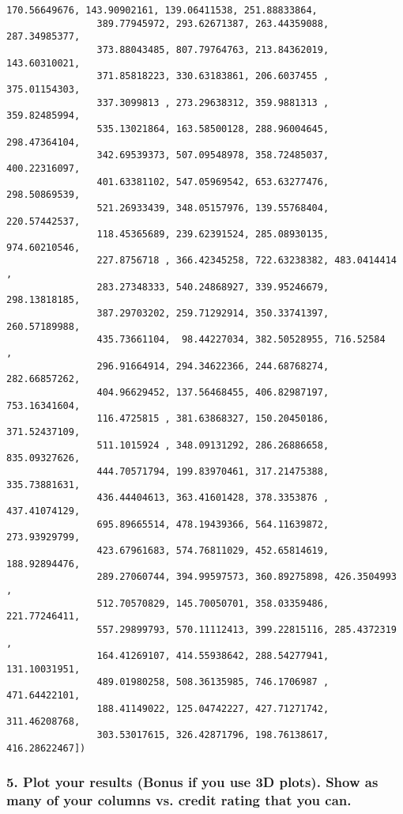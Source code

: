 \documentclass[11pt]{article}
\begin{document}
\begin{Verbatim}[commandchars=\\\{\}]
                170.56649676, 143.90902161, 139.06411538, 251.88833864,
                389.77945972, 293.62671387, 263.44359088, 287.34985377,
                373.88043485, 807.79764763, 213.84362019, 143.60310021,
                371.85818223, 330.63183861, 206.6037455 , 375.01154303,
                337.3099813 , 273.29638312, 359.9881313 , 359.82485994,
                535.13021864, 163.58500128, 288.96004645, 298.47364104,
                342.69539373, 507.09548978, 358.72485037, 400.22316097,
                401.63381102, 547.05969542, 653.63277476, 298.50869539,
                521.26933439, 348.05157976, 139.55768404, 220.57442537,
                118.45365689, 239.62391524, 285.08930135, 974.60210546,
                227.8756718 , 366.42345258, 722.63238382, 483.0414414 ,
                283.27348333, 540.24868927, 339.95246679, 298.13818185,
                387.29703202, 259.71292914, 350.33741397, 260.57189988,
                435.73661104,  98.44227034, 382.50528955, 716.52584   ,
                296.91664914, 294.34622366, 244.68768274, 282.66857262,
                404.96629452, 137.56468455, 406.82987197, 753.16341604,
                116.4725815 , 381.63868327, 150.20450186, 371.52437109,
                511.1015924 , 348.09131292, 286.26886658, 835.09327626,
                444.70571794, 199.83970461, 317.21475388, 335.73881631,
                436.44404613, 363.41601428, 378.3353876 , 437.41074129,
                695.89665514, 478.19439366, 564.11639872, 273.93929799,
                423.67961683, 574.76811029, 452.65814619, 188.92894476,
                289.27060744, 394.99597573, 360.89275898, 426.3504993 ,
                512.70570829, 145.70050701, 358.03359486, 221.77246411,
                557.29899793, 570.11112413, 399.22815116, 285.4372319 ,
                164.41269107, 414.55938642, 288.54277941, 131.10031951,
                489.01980258, 508.36135985, 746.1706987 , 471.64422101,
                188.41149022, 125.04742227, 427.71271742, 311.46208768,
                303.53017615, 326.42871796, 198.76138617, 416.28622467])
\end{Verbatim}
            
    \subsubsection{5. Plot your results (Bonus if you use 3D plots). Show as
many of your columns vs. credit rating that you
can.}\label{plot-your-results-bonus-if-you-use-3d-plots.-show-as-many-of-your-columns-vs.-credit-rating-that-you-can.}
\end{document}
